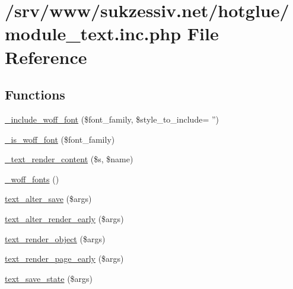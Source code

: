 \hypertarget{module__text_8inc_8php}{
\section{/srv/www/sukzessiv.net/hotglue/module\_\-text.inc.php File Reference}
\label{module__text_8inc_8php}
}
\subsection*{Functions}
\begin{DoxyCompactItemize}
\item 
\hyperlink{module__text_8inc_8php_a1cee3a7df743730d3e13919dede62d85}{\_\-include\_\-woff\_\-font} (\$font\_\-family, \$style\_\-to\_\-include= '')
\item 
\hyperlink{module__text_8inc_8php_a270432cf0918807ddfc6b698539d02e3}{\_\-is\_\-woff\_\-font} (\$font\_\-family)
\item 
\hyperlink{module__text_8inc_8php_a0586b5e177a15f5904d49b8b3aaf19ee}{\_\-text\_\-render\_\-content} (\$s, \$name)
\item 
\hyperlink{module__text_8inc_8php_a579e502fadfb1146d8470c8f409916fd}{\_\-woff\_\-fonts} ()
\item 
\hyperlink{module__text_8inc_8php_aaee0a89ba2b213f761b05ca2d6460910}{text\_\-alter\_\-save} (\$args)
\item 
\hyperlink{module__text_8inc_8php_ac57835ba072c7df9367b2c277d2f5bd7}{text\_\-alter\_\-render\_\-early} (\$args)
\item 
\hyperlink{module__text_8inc_8php_a8e9b1db22ff6cb0f3d20815da6aae6ce}{text\_\-render\_\-object} (\$args)
\item 
\hyperlink{module__text_8inc_8php_aaaa8b8407d795f6dba9d258f1457ade8}{text\_\-render\_\-page\_\-early} (\$args)
\item 
\hyperlink{module__text_8inc_8php_a7fa0ea2ee517914595d7eda355177289}{text\_\-save\_\-state} (\$args)
\end{DoxyCompactItemize}



